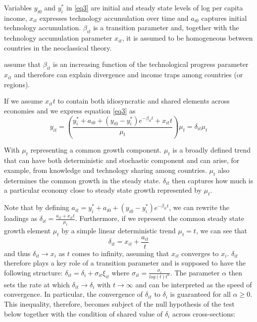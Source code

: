 \documentclass[11pt]{article}
\begin{document}
 Variables $y_{i0}$ and $y_{i}^{*}$ in \eqref{eq3} are initial and steady state levels of log per capita income, $x_{it}$ expresses technology accumulation over time and $a_{i0}$ captures initial technology accumulation. $\beta_{it}$ is a transition parameter and, together with the technology accumulation parameter $x_{it}$, it is assumed to be homogeneous between countries in the neoclassical theory.

\citeauthor{phillips2007transition} assume that $\beta_{it}$ is an increasing function of the technological progress parameter $x_{it}$ and therefore can explain divergence and income traps among countries (or regions).

If we assume $x_{it}t$ to contain both idiosyncratic and shared elements across economies and we express equation \eqref{eq3} as
\begin{equation} \label{eq4} y_{it} = \left(\frac{ y_i^* + a_{i0} + (y_{i0} - y_i^*)e^{-\beta_{it}t} + x_{it}t}{\mu_t}\right)\mu_t = \delta_{it}\mu_t  \end{equation}


With $\mu_t$ representing a common growth component.
$\mu_t$ is a broadly defined trend that can have both deterministic and stochastic component and can arise, for example, from knowledge and technology sharing among countries. $\mu_t$ also determines the common growth in the steady state. $\delta_{it}$ then captures how much is a particular economy close to steady state growth represented by $\mu_t$.

Note that by defining \(a_{it} = y_i^* + a_{i0} + (y_{i0} - y_i^*)e^{-\beta_{it}t} \), we can rewrite the loadings as \(\delta_{it} = \frac{a_{it} + x_{it}t}{\mu_t}\). Furthermore, if we represent the common steady state growth element $\mu_t$ by a simple linear deterministic trend \(\mu_t = t\), we can see that
\begin{equation} \label{eq5}\delta_{it} = x_{it} + \frac{a_{it}}{t} \end{equation}  and thus \(\delta_{it} \rightarrow x_i\) as $t$ comes to infinity, assuming that $x_{it}$ converges to $x_{i}$. $\delta_{it}$ therefore plays a key role of a transition parameter and is supposed to have the following structure: \(\delta_{it} = \delta_{i} + \sigma_{it}\xi_{it}\) where \( \sigma_{it} = \frac{\sigma_{i}}{log(t)t^\alpha}\). The parameter $\alpha$ then sets the rate at which \(\delta_{it} \rightarrow \delta_{i}\) with \(t \rightarrow \infty\) and can be interpreted as the speed of convergence. In particular, the convergence of $\delta_{it}$ to $\delta_{i}$ is guaranteed for all \(\alpha \geq 0\). This inequality, therefore, becomes subject of the null hypothesis of the test below together with the condition of shared value of $\delta_{i}$ across cross-sections: 
\end{document}
